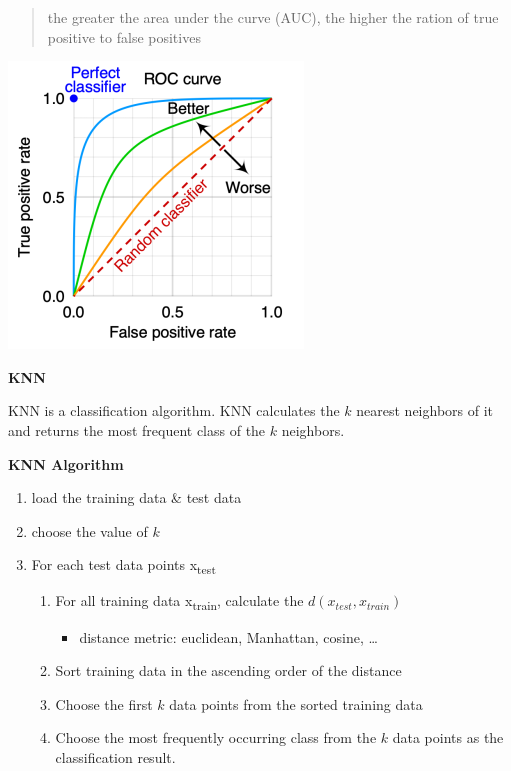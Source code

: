 \documentclass[11pt,landscape]{article}
\begin{document}
\begin{multicols}{3}
\begin{quote}
the greater the area under the curve (AUC), the higher the ration of true positive to false positives
\end{quote}


\begin{center}
\includegraphics[width=.9\linewidth]{img/roc.png}
\end{center}


\textbf{KNN}

KNN is a classification algorithm.
KNN calculates the \(k\) nearest neighbors of it and returns the most frequent class of the \(k\) neighbors.


\textbf{KNN Algorithm}

\begin{enumerate}
\item load the training data \& test data
\item choose the value of \(k\)
\item For each test data points x\textsubscript{test}
\begin{enumerate}
\item For all training data x\textsubscript{train}, calculate the \(d(x_{test}, x_{train})\)
\begin{itemize}
\item distance metric: euclidean, Manhattan, cosine, \ldots{}
\end{itemize}
\item Sort training data in the ascending order of the distance
\item Choose the first \(k\) data points from the sorted training data
\item Choose the most frequently occurring class from the \(k\) data points as the classification result.
\end{enumerate}
\end{enumerate}



\end{multicols}
\end{document}
